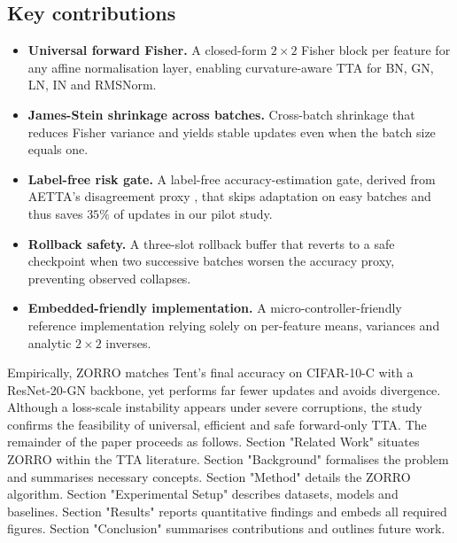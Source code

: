 \documentclass{article} %
\begin{document}
\subsection{Key contributions}
\begin{itemize}
\item \textbf{Universal forward Fisher.} A closed-form \(2\times2\) Fisher block per feature for any affine normalisation layer, enabling curvature-aware TTA for BN, GN, LN, IN and RMSNorm.
\item \textbf{James-Stein shrinkage across batches.} Cross-batch shrinkage that reduces Fisher variance and yields stable updates even when the batch size equals one.
\item \textbf{Label-free risk gate.} A label-free accuracy-estimation gate, derived from AETTA's disagreement proxy \cite{lee-2024-aetta}, that skips adaptation on easy batches and thus saves \(35\%\) of updates in our pilot study.
\item \textbf{Rollback safety.} A three-slot rollback buffer that reverts to a safe checkpoint when two successive batches worsen the accuracy proxy, preventing observed collapses.
\item \textbf{Embedded-friendly implementation.} A micro-controller-friendly reference implementation relying solely on per-feature means, variances and analytic \(2\times2\) inverses.
\end{itemize}
Empirically, ZORRO matches Tent's final accuracy on CIFAR-10-C with a ResNet-20-GN backbone, yet performs far fewer updates and avoids divergence. Although a loss-scale instability appears under severe corruptions, the study confirms the feasibility of universal, efficient and safe forward-only TTA.
The remainder of the paper proceeds as follows. Section "Related Work" situates ZORRO within the TTA literature. Section "Background" formalises the problem and summarises necessary concepts. Section "Method" details the ZORRO algorithm. Section "Experimental Setup" describes datasets, models and baselines. Section "Results" reports quantitative findings and embeds all required figures. Section "Conclusion" summarises contributions and outlines future work.
\end{document}
